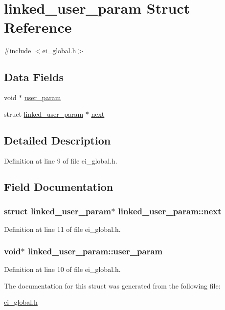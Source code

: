 \hypertarget{structlinked__user__param}{
\section{linked\_\-user\_\-param Struct Reference}
\label{structlinked__user__param}
}


{\ttfamily \#include $<$ei\_\-global.h$>$}\subsection*{Data Fields}
\begin{DoxyCompactItemize}
\item 
void $\ast$ \hyperlink{structlinked__user__param_a7deced2e9984824fbbe86511802b9154}{user\_\-param}
\item 
struct \hyperlink{structlinked__user__param}{linked\_\-user\_\-param} $\ast$ \hyperlink{structlinked__user__param_a08cf39aa813e07d1420451a39efde10d}{next}
\end{DoxyCompactItemize}


\subsection{Detailed Description}


Definition at line 9 of file ei\_\-global.h.

\subsection{Field Documentation}
\hypertarget{structlinked__user__param_a08cf39aa813e07d1420451a39efde10d}{
\subsubsection[{next}]{\setlength{\rightskip}{0pt plus 5cm}struct {\bf linked\_\-user\_\-param}$\ast$ {\bf linked\_\-user\_\-param::next}}}
\label{structlinked__user__param_a08cf39aa813e07d1420451a39efde10d}


Definition at line 11 of file ei\_\-global.h.\hypertarget{structlinked__user__param_a7deced2e9984824fbbe86511802b9154}{
\subsubsection[{user\_\-param}]{\setlength{\rightskip}{0pt plus 5cm}void$\ast$ {\bf linked\_\-user\_\-param::user\_\-param}}}
\label{structlinked__user__param_a7deced2e9984824fbbe86511802b9154}


Definition at line 10 of file ei\_\-global.h.

The documentation for this struct was generated from the following file:\begin{DoxyCompactItemize}
\item 
\hyperlink{ei__global_8h}{ei\_\-global.h}\end{DoxyCompactItemize}
